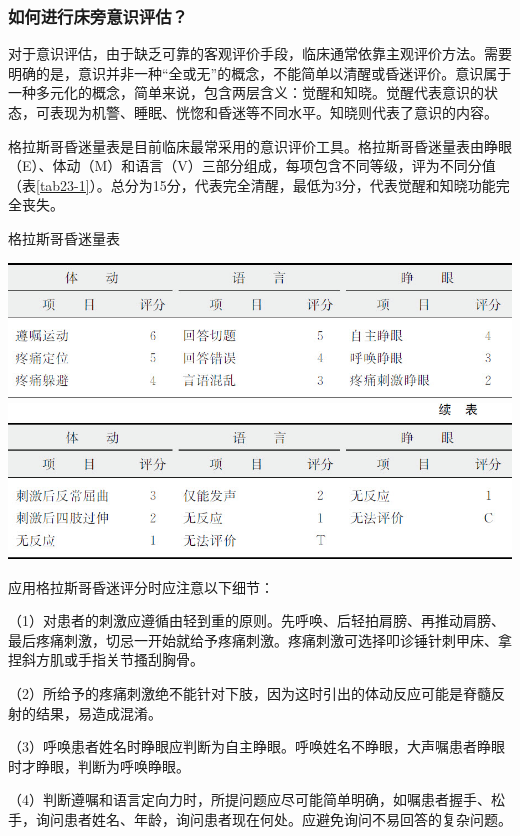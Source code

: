 \subsubsection{如何进行床旁意识评估？}

对于意识评估，由于缺乏可靠的客观评价手段，临床通常依靠主观评价方法。需要明确的是，意识并非一种“全或无”的概念，不能简单以清醒或昏迷评价。意识属于一种多元化的概念，简单来说，包含两层含义：觉醒和知晓。觉醒代表意识的状态，可表现为机警、睡眠、恍惚和昏迷等不同水平。知晓则代表了意识的内容。

格拉斯哥昏迷量表是目前临床最常采用的意识评价工具。格拉斯哥昏迷量表由睁眼（E）、体动（M）和语言（V）三部分组成，每项包含不同等级，评为不同分值（表\ref{tab23-1}）。总分为15分，代表完全清醒，最低为3分，代表觉醒和知晓功能完全丧失。

\begin{table}[htbp]
\centering
\caption{格拉斯哥昏迷量表}
\label{tab23-1}
\includegraphics{./images/Image00261.jpg}
\includegraphics{./images/Image00262.jpg}
\end{table}

应用格拉斯哥昏迷评分时应注意以下细节：

（1）对患者的刺激应遵循由轻到重的原则。先呼唤、后轻拍肩膀、再推动肩膀、最后疼痛刺激，切忌一开始就给予疼痛刺激。疼痛刺激可选择叩诊锤针刺甲床、拿捏斜方肌或手指关节搔刮胸骨。

（2）所给予的疼痛刺激绝不能针对下肢，因为这时引出的体动反应可能是脊髓反射的结果，易造成混淆。

（3）呼唤患者姓名时睁眼应判断为自主睁眼。呼唤姓名不睁眼，大声嘱患者睁眼时才睁眼，判断为呼唤睁眼。

（4）判断遵嘱和语言定向力时，所提问题应尽可能简单明确，如嘱患者握手、松手，询问患者姓名、年龄，询问患者现在何处。应避免询问不易回答的复杂问题。

